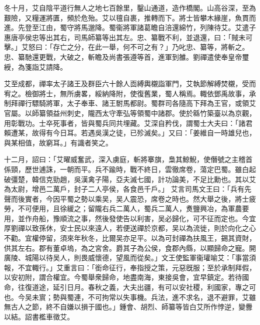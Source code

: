 \begin{pinyinscope}
 
 
 
 冬十月，艾自陰平道行無人之地七百餘里，鑿山通道，造作橋閣。山高谷深，至為艱險，又糧運將匱，頻於危殆。艾以氊自裹，推轉而下。將士皆攀木緣崖，魚貫而進。先登至江由，蜀守將馬邈降。蜀衞將軍諸葛瞻自涪還綿竹，列陳待艾。艾遣子惠唐亭侯忠等出其右，司馬師纂等出其左。忠、纂戰不利，並退還，曰：「賊未可擊。」艾怒曰：「存亡之分，在此一舉，何不可之有？」乃叱忠、纂等，將斬之。忠、纂馳還更戰，大破之，斬瞻及尚書張遵等首，進軍到雒。劉禪遣使奉皇帝璽綬，為箋詣艾請降。
 
 
 
 
 艾至成都，禪率太子諸王及群臣六十餘人靣縛輿櫬詣軍門，艾執節解縛焚櫬，受而宥之。檢御將士，無所虜畧，綏納降附，使復舊業，蜀人稱焉。輙依鄧禹故事，承制拜禪行驃騎將軍，太子奉車、諸王駙馬都尉。蜀群司各隨高下拜為王官，或領艾官屬。以師纂領益州刺史，隴西太守牽弘等領蜀中諸郡。使於緜竹築臺以為京觀，用彰戰功。士卒死事者，皆與蜀兵同共埋藏。艾深自矜伐，謂蜀士大夫曰：「諸君賴遭某，故得有今日耳。若遇吳漢之徒，已殄滅矣。」又曰：「姜維自一時雄兒也，與某相值，故窮耳。」有識者笑之。
 
 
十二月，詔曰：「艾曜威奮武，深入虜庭，斬將搴旗，梟其鯨鯢，使僭號之主稽首係頸，歷世逋誅，一朝而平。兵不踰時，戰不終日，雲徹席卷，蕩定巴蜀。雖白起破彊楚，韓信克勁趙，吳漢禽子陽，亞夫滅七國，計功論美，不足比勳也。其以艾為太尉，增邑二萬戶，封子二人亭侯，各食邑千戶。」
 艾言司馬文王曰：「兵有先聲而後實者，今因平蜀之勢以乘吴，吴人震恐，席卷之時也。然大舉之後，將士疲勞，不可便用，且徐緩之；留隴右兵二萬人，蜀兵二萬人，煑鹽興冶，為軍農要用，並作舟船，豫順流之事，然後發使告以利害，吴必歸化，可不征而定也。今宜厚劉禪以致孫休，安士民以來遠人，若便送禪於京都，吴以為流徙，則於向化之心不勸。宜權停留，須來年秋冬，比爾吴亦足平。以為可封禪為扶風王，錫其資財，供其左右。郡有董卓塢，為之宮舍。爵其子為公侯，食郡內縣，以顯歸命之寵。開廣陵、城陽以待吴人，則畏威懷德，望風而從矣。」文王使監軍衞瓘喻艾：「事當須報，不宜輙行。」艾重言曰：「銜命征行，奉指授之策，元惡旣服；至於承制拜假，以安初附，謂合權宜。今蜀舉衆歸命，地盡南海，東接吳會，宜早鎮定。若待國命，往復道途，延引日月。春秋之義，大夫出疆，有可以安社稷，利國家，專之可也。今吴未賔；勢與蜀連，不可拘常以失事機。兵法，進不求名，退不避罪，艾雖無古人之節，終不自嫌以損于國也。」鍾會、胡烈、師纂等皆白艾所作悖逆，變釁以結。詔書檻車徵艾。
 

\end{pinyinscope}
